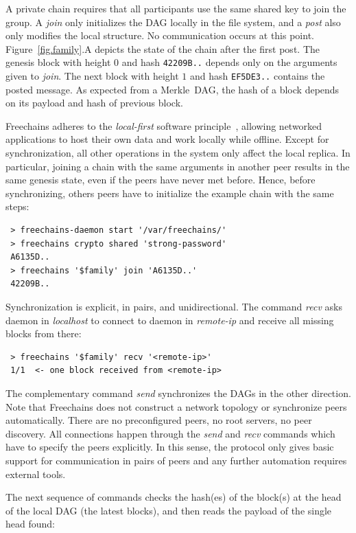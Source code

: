 \documentclass[10pt,journal,compsoc]{IEEEtran}
\newcommand{\FC}       {Freechains\xspace}
\begin{document}
A private chain requires that all participants use the same shared key to join
the group.
A \emph{join} only initializes the DAG locally in the file system, and a
\emph{post} also only modifies the local structure.
No communication occurs at this point.
Figure~\ref{fig.family}.A depicts the state of the chain after the first post.
The genesis block with height $0$ and hash \texttt{42209B..}
depends only on the arguments given to \emph{join}.
The next block with height $1$ and hash \texttt{EF5DE3..} contains the posted
message.
As expected from a Merkle~DAG, the hash of a block depends on its payload and
hash of previous block.

\FC adheres to the \emph{local-first} software principle~\cite{p2p.local},
allowing networked applications to host their own data and work locally while
offline.
Except for synchronization, all other operations in the system only affect the
local replica.
In particular, joining a chain with the same arguments in another peer results
in the same genesis state, even if the peers have never met before.
Hence, before synchronizing, others peers have to initialize the example chain
with the same steps:

{\footnotesize
\begin{verbatim}
 > freechains-daemon start '/var/freechains/'
 > freechains crypto shared 'strong-password'
 A6135D..
 > freechains '$family' join 'A6135D..'
 42209B..
\end{verbatim}
}

Synchronization is explicit, in pairs, and unidirectional.
The command \emph{recv} asks daemon in \emph{localhost} to connect to daemon in
\emph{remote-ip} and receive all missing blocks from there:

{\footnotesize
\begin{verbatim}
 > freechains '$family' recv '<remote-ip>'
 1/1  <- one block received from <remote-ip>
\end{verbatim}
}

The complementary command \emph{send} synchronizes the DAGs in the other
direction.
Note that \FC does not construct a network topology or synchronize peers
automatically.
There are no preconfigured peers, no root servers, no peer discovery.
All connections happen through the \emph{send} and \emph{recv} commands which
have to specify the peers explicitly.
In this sense, the protocol only gives basic support for communication in pairs
of peers and any further automation requires external tools.

The next sequence of commands checks the hash(es) of the block(s) at the head
of the local DAG (the latest blocks), and then reads the payload of the single
head found:
\end{document}
